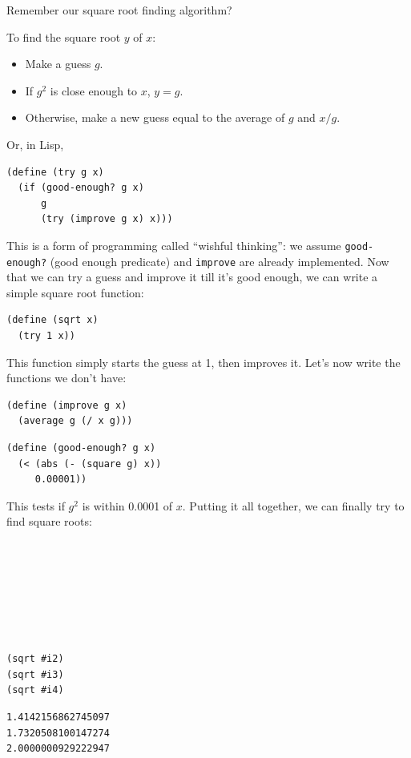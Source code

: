 \documentclass[9pt]{report}
\begin{document}
Remember our square root finding algorithm?

To find the square root \(y\) of \(x\):
\begin{itemize}
\item Make a guess \(g\).
\item If \(g^2\) is close enough to \(x\), \(y=g\).
\item Otherwise, make a new guess equal to the average of \(g\) and
\(x/g\).
\end{itemize}

Or, in Lisp,

\begin{verbatim}
(define (try g x)
  (if (good-enough? g x)
      g
      (try (improve g x) x)))
\end{verbatim}

This is a form of programming called ``wishful thinking'': we assume
\texttt{good-enough?} (good enough predicate) and \texttt{improve} are already
implemented. Now that we can try a guess and improve it till it's
good enough, we can write a simple square root function:

\begin{verbatim}
(define (sqrt x)
  (try 1 x))
\end{verbatim}

This function simply starts the guess at 1, then improves it. Let's
now write the functions we don't have:

\begin{verbatim}
(define (improve g x)
  (average g (/ x g)))
\end{verbatim}

\begin{verbatim}
(define (good-enough? g x)
  (< (abs (- (square g) x))
     0.00001))
\end{verbatim}

This tests if \(g^2\) is within 0.0001 of \(x\). Putting it all
together, we can finally try to find square roots:

\begin{verbatim}







(sqrt #i2)
(sqrt #i3)
(sqrt #i4)
\end{verbatim}

\begin{verbatim}
1.4142156862745097
1.7320508100147274
2.0000000929222947
\end{verbatim}
\end{document}
